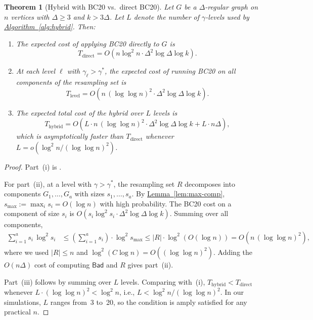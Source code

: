 \documentclass[12pt, a4paper]{article}
\theoremstyle{plain}
\newtheorem{theorem}{Theorem}
\theoremstyle{definition}
\theoremstyle{remark}
\newcommand{\lt}{\left}
\newcommand{\rt}{\right}
\newcommand{\sref}[2]{\hyperref[#2]{#1~\ref*{#2}}}
\newcommand{\bad}{\mathsf{Bad}}
\begin{document}
\begin{theorem}[Hybrid with BC20 vs.\ direct BC20]\label{thm:hybrid-vs-direct}
Let \(G\) be a \(\Delta\)-regular graph on \(n\) vertices with \(\Delta\geq3\) and \(k>3\Delta\). Let \(L\) denote the number of \(\gamma\)-levels used by \sref{Algorithm}{alg:hybrid}. Then:
\begin{enumerate}[label=(\roman*)]
\item The expected cost of applying BC20 \cite{BC20} directly to \(G\) is
\[
T_{\mathrm{direct}} = O\!\lt(n\log^2 n\cdot\Delta^2\log\Delta\log k\rt).
\]
\item At each level \(\ell\) with \(\gamma_\ell>\gamma^*\), the expected cost of running BC20 on all components of the resampling set is
\[
T_{\mathrm{level}} = O\!\lt(n\,(\log\log n)^2\cdot\Delta^2\log\Delta\log k\rt).
\]
\item The expected total cost of the hybrid over \(L\) levels is
\[
T_{\mathrm{hybrid}} = O\!\lt(L\cdot n\,(\log\log n)^2\cdot\Delta^2\log\Delta\log k + L\cdot n\Delta\rt),
\]
which is asymptotically faster than \(T_{\mathrm{direct}}\) whenever \(L = o\!\lt(\log^2 n / (\log\log n)^2\rt)\).
\end{enumerate}
\end{theorem}

\begin{proof}
Part~(i) is \cite[Theorem 1.1]{BC20}.

For part~(ii), at a level with \(\gamma>\gamma^*\), the resampling set \(R\) decomposes into components \(G_1,\ldots,G_a\) with sizes \(s_1,\ldots,s_a\). By \sref{Lemma}{lem:max-comp}, \(s_{\max}:=\max_i s_i = O(\log n)\) with high probability. The BC20 cost on a component of size \(s_i\) is \(O(s_i\log^2 s_i\cdot\Delta^2\log\Delta\log k)\). Summing over all components,
\begin{align*}
\sum_{i=1}^a s_i\,\log^2 s_i &\leq \lt(\sum_{i=1}^a s_i\rt)\cdot \log^2 s_{\max} \leq |R|\cdot\log^2(O(\log n)) = O\!\lt(n\,(\log\log n)^2\rt),
\end{align*}
where we used \(|R|\leq n\) and \(\log^2(C\log n) = O((\log\log n)^2)\). Adding the \(O(n\Delta)\) cost of computing \(\bad\) and \(R\) gives part~(ii).

Part~(iii) follows by summing over \(L\) levels. Comparing with~(i), \(T_{\mathrm{hybrid}} < T_{\mathrm{direct}}\) whenever \(L\cdot(\log\log n)^2 < \log^2 n\), i.e., \(L < \log^2 n/(\log\log n)^2\). In our simulations, \(L\) ranges from~3 to~20, so the condition is amply satisfied for any practical \(n\).
\end{proof}
\end{document}
